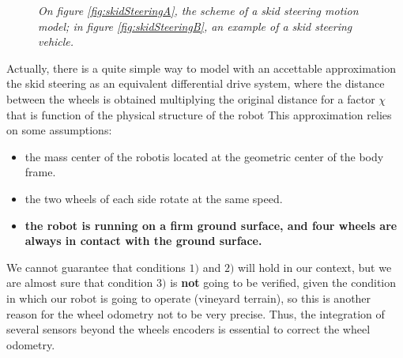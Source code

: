 \begin{figure}
	\centering
	\qquad
	\caption{\textit{On figure \ref{fig:skidSteeringA}, the scheme of a skid steering motion model; in figure \ref{fig:skidSteeringB}, an example of a skid steering vehicle.}}
	\label{fig:skidSteering}
\end{figure}

Actually, there is a quite simple way  \parencite{skid2diff} to model with an accettable approximation the skid steering as an equivalent differential drive system, where the distance between the wheels is obtained multiplying the original distance for a factor $\chi$ that is function of the physical structure of the robot
This approximation relies on some assumptions:
\begin{itemize}
	\item the mass center of the robotis located at the geometric center of the body frame.
	\item the two wheels of each side rotate at the same speed.
	\item \textbf{the robot is running on a firm ground surface, and four wheels are always in contact with the ground surface.}
\end{itemize}
We cannot guarantee that conditions $1)$ and $2)$ will hold in our context, but we are almost sure that condition $3)$ is \textbf{not} going to be verified, given the condition in which our robot is going to operate (vineyard terrain), so this is another reason for the wheel odometry not to be very precise. Thus, the integration of several sensors beyond the wheels encoders is essential to correct the wheel odometry.

